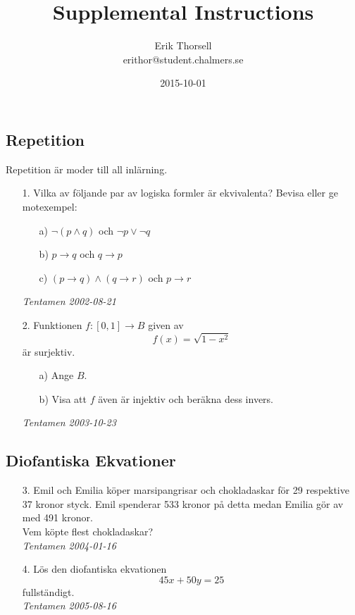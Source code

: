 \documentclass{article}
\title{Supplemental Instructions}
\author{Erik Thorsell \\ 
		\small{erithor@student.chalmers.se}
}
\date{2015-10-01}
\begin{document}
\maketitle


\subsection*{Repetition}
Repetition är moder till all inlärning.
\begin{enumerate}

\item[1.]
Vilka av följande par av logiska formler är ekvivalenta? Bevisa eller ge 
motexempel:
\begin{itemize}
    \item[a) ] $\neg (p \land q)$ och $\neg p \lor \neg q$
    \item[b) ] $p \rightarrow q$ och $q \rightarrow p$
    \item[c) ] $(p \rightarrow q) \land (q \rightarrow r)$ och $p \rightarrow r$
\end{itemize}
{\it Tentamen 2002-08-21}

\item[2.]
Funktionen $f:[0,1] \rightarrow B$ given av $$f(x) = \sqrt{1-x^2}$$ är surjektiv.
\begin{itemize}
    \item[a) ] Ange $B$.
    \item[b) ] Visa att $f$ även är injektiv och beräkna dess invers.
\end{itemize}
{\it Tentamen 2003-10-23}
\end{enumerate}


\subsection*{Diofantiska Ekvationer}
\begin{enumerate}

\item[3.]
Emil och Emilia köper marsipangrisar och chokladaskar för 29 respektive 37 
kronor styck. Emil spenderar 533 kronor på detta medan Emilia gör av med 491 
kronor.\\
Vem köpte flest chokladaskar?\\

{\it Tentamen 2004-01-16}

\item[4.]
Lös den diofantiska ekvationen $$45x+50y=25$$ fullständigt.\\

{\it Tentamen 2005-08-16}
\end{enumerate}
\end{document}
